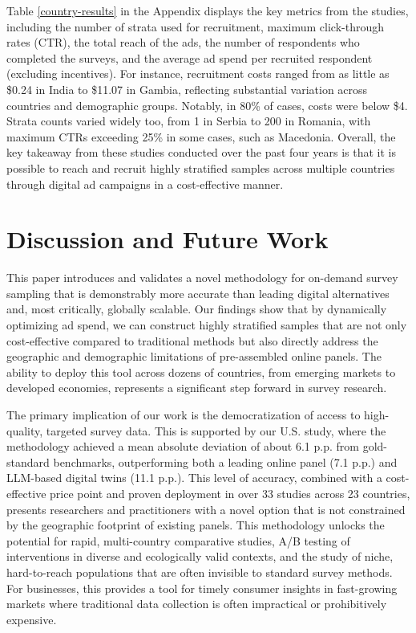 Table \ref{country-results} in the Appendix displays the key metrics from the studies, including the number of strata used for recruitment, maximum click-through rates (CTR), the total reach of the ads, the number of respondents who completed the surveys, and the average ad spend per recruited respondent (excluding incentives). For instance, recruitment costs ranged from as little as \$0.24 in India to \$11.07 in Gambia, reflecting substantial variation across countries and demographic groups. Notably, in 80\% of cases, costs were below \$4.
Strata counts varied widely too, from 1 in Serbia to 200 in Romania, with maximum CTRs exceeding 25\% in some cases, such as Macedonia. Overall, the key takeaway from these studies conducted over the past four years is that it is possible to reach and recruit highly stratified samples across multiple countries through digital ad campaigns in a cost-effective manner.


\section{Discussion and Future Work}

This paper introduces and validates a novel methodology for on-demand survey sampling that is demonstrably more accurate than leading digital alternatives and, most critically, globally scalable. Our findings show that by dynamically optimizing ad spend, we can construct highly stratified samples that are not only cost-effective compared to traditional methods but also directly address the geographic and demographic limitations of pre-assembled online panels. The ability to deploy this tool across dozens of countries, from emerging markets to developed economies, represents a significant step forward in survey research.

The primary implication of our work is the democratization of access to high-quality, targeted survey data. This is supported by our U.S. study, where the methodology achieved a mean absolute deviation of about 6.1 p.p. from gold-standard benchmarks, outperforming both a leading online panel (7.1 p.p.) and LLM-based digital twins (11.1 p.p.). This level of accuracy, combined with a cost-effective price point and proven deployment in over 33 studies across 23 countries, presents researchers and practitioners with a novel option that is not constrained by the geographic footprint of existing panels. This methodology unlocks the potential for rapid, multi-country comparative studies, A/B testing of interventions in diverse and ecologically valid contexts, and the study of niche, hard-to-reach populations that are often invisible to standard survey methods. For businesses, this provides a tool for timely consumer insights in fast-growing markets where traditional data collection is often impractical or prohibitively expensive.

